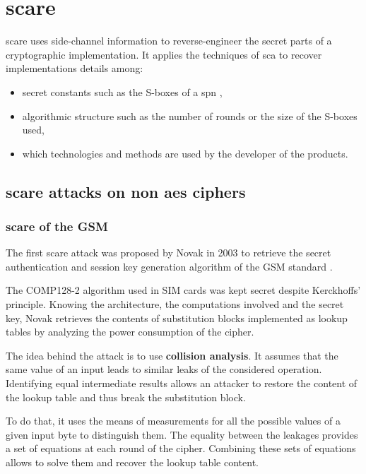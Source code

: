 \documentclass[11pt]{sdm}
\begin{document}


\section{\acrlong{scare}}

\acrfull{scare} uses side-channel information to reverse-engineer the secret parts of a cryptographic implementation.
It applies the techniques of \gls{sca} to recover implementations details among:
\begin{itemize}
    \item secret constants such as the S-boxes of a \gls{spn} \parencite{Novak_2003},
    \item algorithmic structure such as the number of rounds or the size of the S-boxes used,
    \item which technologies and methods are used by the developer of the products.
\end{itemize}

\subsection{\gls{scare} attacks on non \gls{aes} ciphers}
\label{scare_non_aes}

\subsubsection{\gls{scare} of the GSM}
The first \gls{scare} attack was proposed by Novak in 2003 to retrieve the secret authentication and session key generation algorithm of the GSM standard \parencite{Novak_2003}.

The COMP128-2 algorithm used in SIM cards was kept secret despite Kerckhoffs' principle.
Knowing the architecture, the computations involved and the secret key, Novak retrieves the contents of substitution blocks implemented as lookup tables by analyzing the power consumption of the cipher.

The idea behind the attack is to use \textbf{collision analysis}.
It assumes that the same value of an input leads to similar leaks of the considered operation.
Identifying equal intermediate results allows an attacker to restore the content of the lookup table and thus break the substitution block.

To do that, it uses the means of measurements for all the possible values of a given input byte to distinguish them.
The equality between the leakages provides a set of equations at each round of the cipher.
Combining these sets of equations allows to solve them and recover the lookup table content.
\end{document}

